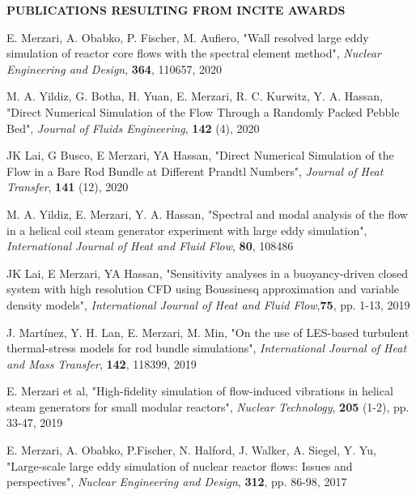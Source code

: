 \documentclass[11pt,letterpaper,english]{article}
\begin{document}
\setlength{\parindent}{0in} %


\pagestyle{fancy}  \renewcommand{%
\headrulewidth}{0.0pt}

\begin{center}
\bf {PUBLICATIONS RESULTING FROM INCITE AWARDS} \\
\end{center}
\vspace{-.25in}

E. Merzari, A. Obabko, P. Fischer, M. Aufiero, "Wall resolved large eddy simulation of reactor core flows with the spectral element method", \textit{Nuclear Engineering and Design}, \textbf{364}, 110657, 2020

M. A. Yildiz, G. Botha, H. Yuan, E. Merzari, R. C. Kurwitz, Y. A. Hassan, "Direct Numerical Simulation of the Flow Through a Randomly Packed Pebble Bed", \textit{Journal of Fluids Engineering}, \textbf{142} (4), 2020

JK Lai, G Busco, E Merzari, YA Hassan, "Direct Numerical Simulation of the Flow in a Bare Rod Bundle at Different Prandtl Numbers", \textit{Journal of Heat Transfer},  \textbf{141} (12), 2020

M. A. Yildiz, E. Merzari, Y. A. Hassan, "Spectral and modal analysis of the flow in a helical coil steam generator experiment with large eddy simulation", \textit{International Journal of Heat and Fluid Flow},  \textbf{80}, 108486

JK Lai, E Merzari, YA Hassan, "Sensitivity analyses in a buoyancy-driven closed system with high resolution CFD using Boussinesq approximation and variable density models", \textit{International Journal of Heat and Fluid Flow},\textbf{75}, pp. 1-13, 2019

J. Martínez, Y. H. Lan, E. Merzari, M. Min, "On the use of LES-based turbulent thermal-stress models for rod bundle simulations", \textit{International Journal of Heat and Mass Transfer}, \textbf{142}, 118399, 2019

E. Merzari et al, "High-fidelity simulation of flow-induced vibrations in helical steam generators for small modular reactors", \textit{Nuclear Technology}, \textbf{205} (1-2), pp. 33-47, 2019

E. Merzari, A. Obabko, P.Fischer, N. Halford, J. Walker, A. Siegel, Y. Yu, "Large-scale large eddy simulation of nuclear reactor flows: Issues and perspectives", \textit{Nuclear Engineering and Design}, \textbf{312}, pp. 86-98, 2017
\end{document}
